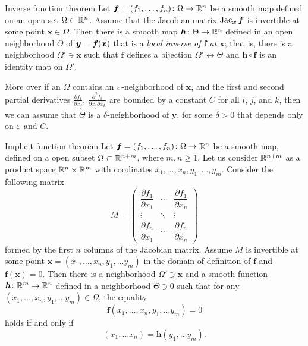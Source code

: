 \begin{thm}{Inverse function theorem}\label{thm:inverse}
Let $\bm{f}=(f_1,\dots,f_n)\colon\Omega\to\mathbb{R}^n$ be a smooth map
defined on an open set $\Omega\subset \mathbb{R}^n$.
Assume that the Jacobian matrix
$\mathop{\rm Jac}\nolimits_{\bm{x}}\bm{f}$
is invertible at some point $\bm{x}\in \Omega$.
Then there is a smooth map $\bm{h}\colon\Theta\to\mathbb{R}^n$ defined in an open neighborhood $\Theta$ of ${\bm{y}}\z=\bm{f}(\bm{x})$ that is a {}\emph{local inverse of $\bm{f}$ at $\bm{x}$};
that is, there is a neighborhood $\Omega'\ni \bm{x}$ such that
$\bm{f}$ defines a bijection $\Omega'\leftrightarrow \Theta$ and
$\bm{h} \circ \bm{f}$ is an identity map on $\Omega'$.

More over if an $\Omega$ contains an $\varepsilon$-neighborhood of $\bm{x}$, and the first and second partial derivatives $\tfrac{\partial f_i}{\partial x_j}$, $\tfrac{\partial^2 f_i}{\partial x_j\partial x_k}$ are bounded by a constant $C$ for all $i$, $j$, and $k$, then we can assume that $\Theta$ is a $\delta$-neighborhood of $\bm{y}$, for some $\delta>0$ that depends only on $\varepsilon$ and $C$. 
\end{thm}

\begin{thm}{Implicit function theorem}\label{thm:imlicit}
Let $\bm{f}=(f_1,\dots,f_n)\colon\Omega\to\mathbb{R}^n$ be a smooth map, defined on a open subset $\Omega\subset\mathbb{R}^{n+m}$, where
$m,n\ge 1$.
Let us consider $\mathbb{R}^{n+m}$ as a product space $\mathbb{R}^n\times \mathbb{R}^m$ with coodinates 
$x_1,\dots,x_n,y_1,\dots,y_m$.
Consider the following matrix 
\[
M=\begin{pmatrix}
\dfrac{\partial f_1}{\partial x_1} & \cdots & \dfrac{\partial f_1}{\partial x_n}\\
\vdots & \ddots & \vdots\\
\dfrac{\partial f_n}{\partial x_1} & \cdots & \dfrac{\partial f_n}{\partial x_n} \end{pmatrix}\]
formed by the first $n$ columns of the Jacobian matrix.
Assume $M$ is invertible at some point $\bm{x}=(x_1,\dots,x_n,y_1,\dots y_m)$ in the domain of definition of $\bm{f}$ and $\bm{f}(\bm{x})=0$.
Then there is a neighborhood $\Omega'\ni \bm{x}$
and a smooth function $\bm{h}\colon\mathbb{R}^m\to\mathbb{R}^n$ defined in a neighborhood $\Theta\ni 0$ such that
for any $(x_1,\dots,x_n,y_1,\dots y_m)\in \Omega$, the equality
\[\bm{f}(x_1,\dots,x_n,y_1,\dots y_m)=0\]
holds if and only if 
\[(x_1,\dots x_n)=\bm{h}(y_1,\dots y_m).\]

\end{thm}

